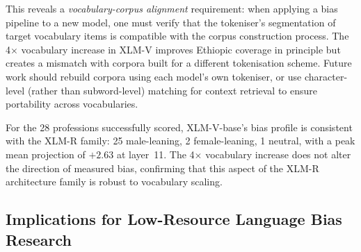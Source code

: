 \documentclass[11pt,a4paper]{article}
\begin{document}
This reveals a \emph{vocabulary-corpus alignment} requirement: when applying a
bias pipeline to a new model, one must verify that the tokeniser's segmentation
of target vocabulary items is compatible with the corpus construction process.
The 4$\times$ vocabulary increase in XLM-V improves Ethiopic coverage in
principle but creates a mismatch with corpora built for a different tokenisation
scheme. Future work should rebuild corpora using each model's own tokeniser,
or use character-level (rather than subword-level) matching for context
retrieval to ensure portability across vocabularies.

For the 28 professions successfully scored, XLM-V-base's bias profile is
consistent with the XLM-R family: 25 male-leaning, 2 female-leaning, 1 neutral,
with a peak mean projection of $+2.63$ at layer~11. The 4$\times$ vocabulary
increase does not alter the direction of measured bias, confirming that this
aspect of the XLM-R architecture family is robust to vocabulary scaling.

\subsection{Implications for Low-Resource Language Bias Research}
\end{document}
